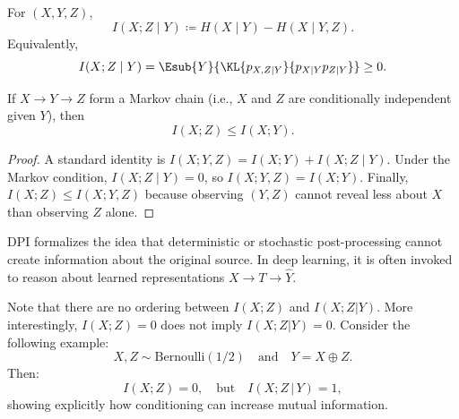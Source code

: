 \begin{definition}
For $(X,Y,Z)$,
\begin{equation}
    I(X;Z\mid Y)
    \coloneqq H(X\mid Y)-H(X\mid Y,Z).
\end{equation}
Equivalently,
\begin{equation}
    I(X;Z\mid Y)=\Esub{Y}{\KL{p_{X,Z\mid Y}}{p_{X\mid Y}p_{Z\mid Y}}}\ge 0.
\end{equation}
\end{definition}

\begin{theorem}
\label{thm:dpi}
If $X\to Y\to Z$ form a Markov chain (i.e., $X$ and $Z$ are conditionally independent given $Y$), then
\begin{equation}
    I(X;Z)\le I(X;Y).
\end{equation}
\end{theorem}
\begin{proof}
A standard identity is
\(I(X;Y,Z)=I(X;Y)+I(X;Z\mid Y)\).
Under the Markov condition, $I(X;Z\mid Y)=0$, so $I(X;Y,Z)=I(X;Y)$.
Finally, $I(X;Z)\le I(X;Y,Z)$ because observing $(Y,Z)$ cannot reveal less about $X$ than observing $Z$ alone.
\end{proof}

\begin{remark}
DPI formalizes the idea that deterministic or stochastic post-processing cannot create information about the original source.
In deep learning, it is often invoked to reason about learned representations $X\to T\to \widehat Y$.
\end{remark}


\begin{remark}
Note that there are no ordering between $I(X;Z)$ and $I(X;Z|Y)$.
More interestingly, $I(X;Z)=0$ does not imply $I(X;Z|Y)=0$.
Consider the following example:
\[
X,Z\sim\text{Bernoulli}(1/2)\quad\text{and}\quad Y=X\oplus Z.
\]
Then:
\[
I(X;Z)=0,\quad\text{but}\quad I(X;Z\,|\,Y)=1,
\]
showing explicitly how conditioning can increase mutual information.
\end{remark}

